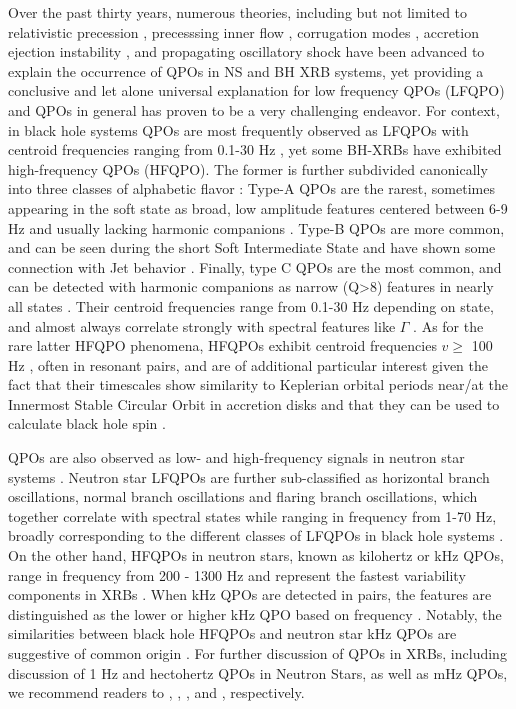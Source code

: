 \documentclass[fleqn,usenatbib]{mnras}
\begin{document}
Over the past thirty years, numerous theories, including but not limited to relativistic precession \citep{lense-thirring-original}, precesssing inner flow \citep{precessionandlense}, corrugation modes \citep{corrugation}, accretion ejection instability \citep{accretion-ejection}, and propagating oscillatory shock \citep{propagatingoscillatoryshock} have been advanced to explain the occurrence of QPOs in NS and BH XRB systems, yet providing a conclusive and let alone universal explanation for low frequency QPOs (LFQPO) and QPOs in general has proven to be a very challenging endeavor. For context, in black hole systems QPOs are most frequently observed as LFQPOs with centroid frequencies ranging from 0.1-30 Hz \citep{belloni2020typeB}, yet some BH-XRBs have exhibited high-frequency QPOs (HFQPO). The former is further subdivided canonically into three classes of alphabetic flavor \citep{casellaABC}: Type-A QPOs are the rarest, sometimes appearing in the soft state as broad, low amplitude features centered between 6-9 Hz and usually lacking harmonic companions \citep{ingram2019}. Type-B QPOs are more common, and can be seen during the short Soft Intermediate State and have shown some connection with Jet behavior \citep{globaltypeB}. Finally, type C QPOs are the most common, and can be detected with harmonic companions as narrow (Q>8) features in nearly all states \citep{typeCmodel2016}. Their centroid frequencies range from 0.1-30 Hz depending on state, and almost always correlate strongly with spectral features like $\Gamma$ \citep{motta2015LotsofQPOs}. As for the rare latter HFQPO phenomena, HFQPOs exhibit centroid frequencies $v\geq$ 100 Hz \citep{motta2011}, often in resonant pairs, and are of additional particular interest given the fact that their timescales show similarity to Keplerian orbital periods near/at the Innermost Stable Circular Orbit in accretion disks \citep{stellaVietriISCO} and that they can be used to calculate black hole spin \citep{Abramowicz2001}.  

QPOs are also observed as low- and high-frequency signals in neutron star systems \citep{wang2016QPOreview}. Neutron star LFQPOs are further sub-classified as horizontal branch oscillations, normal branch oscillations and flaring branch oscillations, which together correlate with spectral states while ranging in frequency from 1-70 Hz, broadly corresponding to the different classes of LFQPOs in black hole systems \citep{homan2015}. On the other hand, HFQPOs in neutron stars, known as kilohertz or kHz QPOs, range in frequency from 200 - 1300 Hz and represent the fastest variability components in XRBs \citep{wang2016QPOreview}. When kHz QPOs are detected in pairs, the features are distinguished as the lower or higher kHz QPO based on frequency \citep{belloniMendez2005}. Notably, the similarities between black hole HFQPOs and neutron star kHz QPOs are suggestive of common origin \citep{Psaltis1999,Bhargava2021}. For further discussion of QPOs in XRBs, including discussion of 1 Hz and hectohertz QPOs in Neutron Stars, as well as mHz QPOs, we recommend readers to \cite{ingram2019}, \cite{oneHZqpo}, \cite{hectohertzKato2005}, and \cite{Revnivtsev2001}, respectively. 
\end{document}
